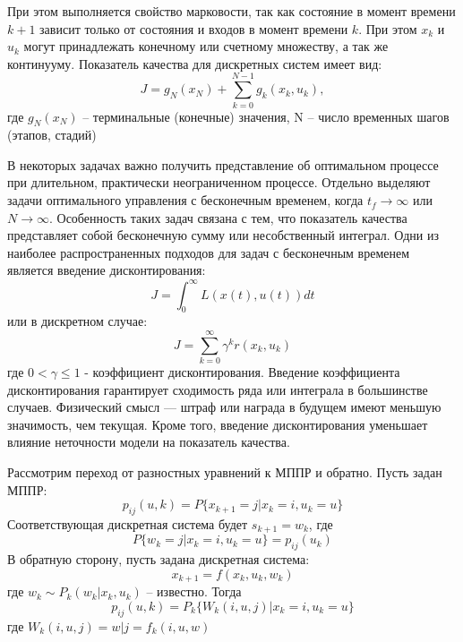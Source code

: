 При этом выполняется свойство марковости, так как состояние в момент времени $k+1$ зависит только от состояния и входов в момент времени $k$. При этом $x_k$ и $u_k$ могут принадлежать конечному или счетному множеству, а так же континууму.
Показатель качества для дискретных систем имеет вид:
\begin{equation}
\label{eq:J_cost}
J = g_N(x_N) + \sum_{k=0}^{N-1} g_k(x_k, u_k),
\end{equation}
где \(g_N(x_N)\) -- терминальные (конечные) значения, N  -- число временных шагов (этапов, стадий)

В некоторых задачах важно получить представление об оптимальном процессе при длительном, практически неограниченном процессе. Отдельно выделяют задачи оптимального управления с бесконечным временем, когда $t_f\xrightarrow{}\infty$ или $N \xrightarrow{} \infty$. Особенность таких задач связана с тем, что показатель качества представляет собой бесконечную сумму или несобственный интеграл. 
Одни из наиболее распространенных подходов для задач с бесконечным временем является введение дисконтирования:
\begin{equation*}
	J = \int_{0}^{\infty} L(x(t), u(t))dt
\end{equation*}
или в дискретном случае:
\begin{equation*}
	J = \sum_{k=0}^{\infty} \gamma^{k}r(x_k,u_k)
\end{equation*}
где $0 < \gamma \leq 1$ - коэффициент дисконтирования.
Введение коэффициента дисконтирования гарантирует сходимость ряда или интеграла в большинстве случаев. Физический смысл — штраф или награда в будущем имеют меньшую значимость, чем текущая. Кроме того, введение дисконтирования уменьшает влияние неточности модели на показатель качества.

Рассмотрим переход от разностных уравнений к МППР и обратно. Пусть задан МППР:
\begin{equation*}
	p_{ij}(u,k)= P\{x_{k+1} = j |x_k = i, u_k = u\}
\end{equation*}
Соответствующая дискретная система будет $s_{k+1} = w_k$, где 
\begin{equation*}
{P\{w_k = j |x_k = i, u_k = u\} = p_{ij}(u_k)}
\end{equation*}
В обратную сторону, пусть задана дискретная система:
\begin{equation}
x_{k+1} = f(x_k, u_k, w_k)
\end{equation}
где $w_k \sim P_k(w_k|x_k,u_k)$ -- известно. Тогда
\begin{equation}
p_{ij}(u,k)= P_k\{W_k(i, u, j) |x_k = i, u_k = u\}
\end{equation}
где $W_k(i, u, j) = {w|j = f_k(i, u, w)}$

